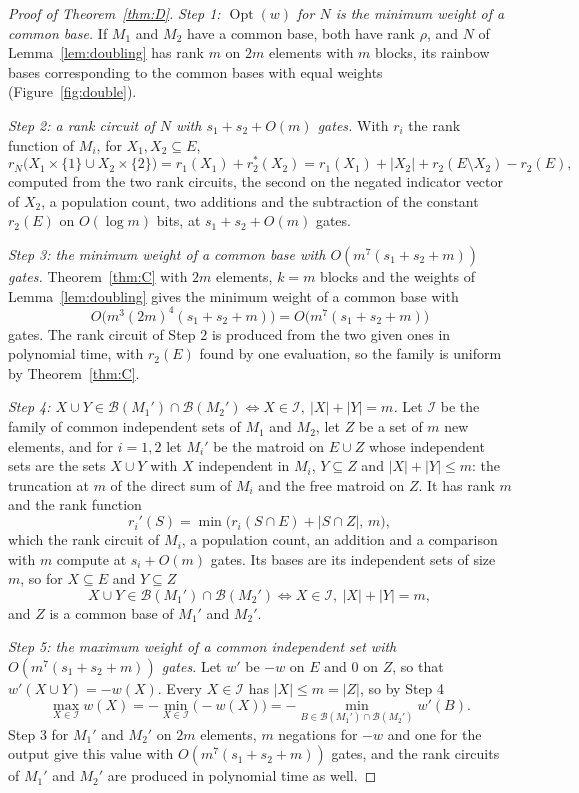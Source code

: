 \documentclass[11pt]{article}
\newcommand{\Opt}{\operatorname{Opt}}
\newcommand{\Bases}{\mathcal B}
\begin{document}
\begin{proof}[Proof of Theorem~\ref{thm:D}]
\emph{Step 1: $\Opt(w)$ for $N$ is the minimum weight of a common base.}  If $M_1$ and $M_2$ have a common base, both have
rank $\rho$, and $N$ of Lemma~\ref{lem:doubling} has rank $m$ on $2m$ elements
with $m$ blocks, its rainbow bases corresponding to the common bases with equal
weights (Figure~\ref{fig:double}).

\emph{Step 2: a rank circuit of $N$ with $s_1+s_2+O(m)$ gates.}  With $r_i$ the rank function of $M_i$, for
$X_1,X_2\subseteq E$,
\[
  r_N\bigl(X_1\times\{1\}\cup X_2\times\{2\}\bigr)=r_1(X_1)+r_2^{*}(X_2)=r_1(X_1)+|X_2|+r_2(E\setminus X_2)-r_2(E),
\]
computed from the two rank circuits, the second on the negated indicator vector
of $X_2$, a population count, two additions and the subtraction of the constant
$r_2(E)$ on $O(\log m)$ bits, at $s_1+s_2+O(m)$ gates.

\emph{Step 3: the minimum weight of a common base with $O(m^{7}(s_1+s_2+m))$ gates.}  Theorem~\ref{thm:C} with $2m$ elements, $k=m$
blocks and the weights of Lemma~\ref{lem:doubling} gives the minimum weight of a
common base with
\[
  O\bigl(m^{3}(2m)^{4}(s_1+s_2+m)\bigr)=O\bigl(m^{7}(s_1+s_2+m)\bigr)
\]
gates.  The rank circuit of Step 2 is produced from the two given ones in
polynomial time, with $r_2(E)$ found by one evaluation, so the family is uniform
by Theorem~\ref{thm:C}.

\emph{Step 4: $X\cup Y\in\Bases(M_1')\cap\Bases(M_2')\iff X\in\mathcal I,\ |X|+|Y|=m$.}  Let $\mathcal I$ be the family of common
independent sets of $M_1$ and $M_2$, let $Z$ be a set of $m$ new elements, and
for $i=1,2$ let $M_i'$ be the matroid on $E\cup Z$ whose independent sets are the
sets $X\cup Y$ with $X$ independent in $M_i$, $Y\subseteq Z$ and
$|X|+|Y|\le m$: the truncation at $m$ of the direct sum of $M_i$ and the free
matroid on $Z$.  It has rank $m$ and the rank function
\[
  r_i'(S)=\min\bigl(r_i(S\cap E)+|S\cap Z|,\,m\bigr),
\]
which the rank circuit of $M_i$, a population count, an addition and a
comparison with $m$ compute at $s_i+O(m)$ gates.  Its bases are its independent
sets of size $m$, so for $X\subseteq E$ and $Y\subseteq Z$
\[
  X\cup Y\in\Bases(M_1')\cap\Bases(M_2')\iff X\in\mathcal I,\ |X|+|Y|=m,
\]
and $Z$ is a common base of $M_1'$ and $M_2'$.

\emph{Step 5: the maximum weight of a common independent set with $O(m^{7}(s_1+s_2+m))$ gates.}  Let $w'$ be $-w$ on $E$ and $0$ on $Z$, so
that $w'(X\cup Y)=-w(X)$.  Every $X\in\mathcal I$ has $|X|\le m=|Z|$, so by Step 4
\[
  \max_{X\in\mathcal I}w(X)=-\min_{X\in\mathcal I}\bigl(-w(X)\bigr)
  =-\min_{B\in\Bases(M_1')\cap\Bases(M_2')}w'(B).
\]
Step 3 for $M_1'$ and $M_2'$ on $2m$ elements, $m$ negations for $-w$ and one
for the output give this value with $O(m^{7}(s_1+s_2+m))$ gates, and the rank
circuits of $M_1'$ and $M_2'$ are produced in polynomial time as well.
\end{proof}
\end{document}
